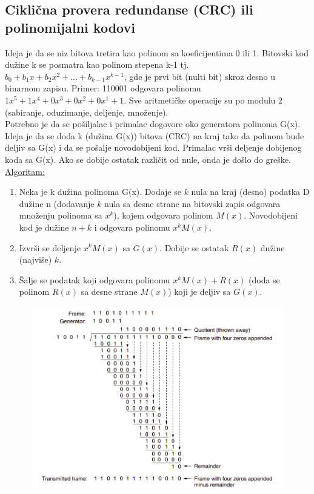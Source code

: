 \documentclass[a4paper]{article}
\begin{document}
\subsection{Ciklična provera redundanse (CRC) ili polinomijalni kodovi} 
    Ideja je da se niz bitova tretira kao polinom sa koeficijentima 0 ili 1. Bitovski kod dužine k se
    posmatra kao polinom stepena k-1 tj. $b_0 + b_1 x + b_2 x^2 + ... + b_{k-1} x^{k-1}$, 
    gde je prvi bit (nulti bit) skroz desno u binarnom zapisu. Primer: 
    110001 odgovara polinomu $1x^5+1x^4+0x^3+0x^2+0x^1+1$. Sve aritmetičke operacije su po modulu 2 
    (sabiranje, oduzimanje, deljenje, množenje). \\
    \indent Potrebno je da se pošiljalac i primalac dogovore 
    oko generatora polinoma G(x). Ideja je da se doda k (dužina G(x)) bitova (CRC) na kraj tako da 
    polinom bude deljiv sa G(x) i da se pošalje novodobijeni kod. Primalac vrši deljenje dobijenog koda sa 
    G(x). Ako se dobije ostatak različit od nule, onda je došlo do greške. \underline{Algoritam:}
    \begin{enumerate}
        \item Neka je k dužina polinoma G(x). Dodaje se $k$ nula na kraj (desno) podatka D dužine n
              (dodavanje $k$ nula sa desne strane na bitovski zapis odgovara množenju polinoma sa $x^k$),
              kojem odgovara polinom $M(x)$. Novodobijeni kod je dužine $n+k$ i odgovara polinomu 
              $x^kM(x)$. 
        \item Izvrši se deljenje $x^kM(x)$ sa $G(x)$. Dobije se ostatak $R(x)$ dužine (najviše) $k$.
        \item Šalje se podatak koji odgovara polinomu $x^kM(x)+R(x)$ (doda se 
              polinom $R(x)$ sa desne strane $M(x)$) koji je deljiv sa $G(x)$.
    \end{enumerate}
    \begin{figure}[H]
        \begin{center}
            \includegraphics[width=120mm,height=80mm]{Slike/detekcija3.png}
        \end{center}
    \end{figure}
\end{document}
